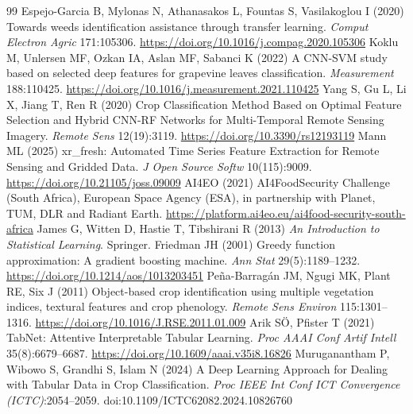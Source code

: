 \documentclass[journal]{IEEEtran}
\begin{document}
\begin{thebibliography}{99}
Espejo-Garcia B, Mylonas N, Athanasakos L, Fountas S, Vasilakoglou I (2020) Towards weeds identification assistance through transfer learning. \textit{Comput Electron Agric} 171:105306. \href{https://doi.org/10.1016/j.compag.2020.105306}{https://doi.org/10.1016/j.compag.2020.105306}
Koklu M, Unlersen MF, Ozkan IA, Aslan MF, Sabanci K (2022) A CNN-SVM study based on selected deep features for grapevine leaves classification. \textit{Measurement} 188:110425. \href{https://doi.org/10.1016/j.measurement.2021.110425}{https://doi.org/10.1016/j.measurement.2021.110425}
Yang S, Gu L, Li X, Jiang T, Ren R (2020) Crop Classification Method Based on Optimal Feature Selection and Hybrid CNN-RF Networks for Multi-Temporal Remote Sensing Imagery. \textit{Remote Sens} 12(19):3119. \href{https://doi.org/10.3390/rs12193119}{https://doi.org/10.3390/rs12193119}
Mann ML (2025) xr\_fresh: Automated Time Series Feature Extraction for Remote Sensing and Gridded Data. \textit{J Open Source Softw} 10(115):9009. \href{https://doi.org/10.21105/joss.09009}{https://doi.org/10.21105/joss.09009}
AI4EO (2021) AI4FoodSecurity Challenge (South Africa), European Space Agency (ESA), in partnership with Planet, TUM, DLR and Radiant Earth. \href{https://platform.ai4eo.eu/ai4food-security-south-africa}{https://platform.ai4eo.eu/ai4food-security-south-africa}
James G, Witten D, Hastie T, Tibshirani R (2013) \textit{An Introduction to Statistical Learning}. Springer.
Friedman JH (2001) Greedy function approximation: A gradient boosting machine. \textit{Ann Stat} 29(5):1189--1232. \href{https://doi.org/10.1214/aos/1013203451}{https://doi.org/10.1214/aos/1013203451}
Pe\~na-Barrag\'an JM, Ngugi MK, Plant RE, Six J (2011) Object-based crop identification using multiple vegetation indices, textural features and crop phenology. \textit{Remote Sens Environ} 115:1301--1316. \href{https://doi.org/10.1016/J.RSE.2011.01.009}{https://doi.org/10.1016/J.RSE.2011.01.009}
Arik SÖ, Pfister T (2021) TabNet: Attentive Interpretable Tabular Learning. \textit{Proc AAAI Conf Artif Intell} 35(8):6679--6687. \href{https://doi.org/10.1609/aaai.v35i8.16826}{https://doi.org/10.1609/aaai.v35i8.16826}
Muruganantham P, Wibowo S, Grandhi S, Islam N (2024) A Deep Learning Approach for Dealing with Tabular Data in Crop Classification. \textit{Proc IEEE Int Conf ICT Convergence (ICTC)}:2054--2059. doi:10.1109/ICTC62082.2024.10826760

\end{thebibliography}
\end{document}
